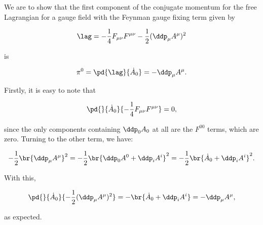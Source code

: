 \section{}

We are to show that the first component of the conjugate momentum for the free Lagrangian for a gauge field with the Feynman gauge fixing term given by 

\begin{equation}
    \lag = -\frac{1}{4}F_{\mu\nu}F^{\mu\nu} - \frac{1}{2}(\ddp_{\mu}A^{\mu})^2
\end{equation}

is

\begin{equation}
    \pi^0 = \pd{\lag}{\dot{A}_0} = -\ddp_{\mu}A^{\mu}.
\end{equation}

Firstly, it is easy to note that 

\begin{equation*}
    \pd{}{\dot{A}_0}{-\frac{1}{4}F_{\mu\nu}F^{\mu\nu}} = 0,
\end{equation*}

since the only components containing $\ddp_0A_0$ at all are the $F^{00}$ terms, which are zero. Turning to the other term, we have:

\begin{equation*}
    -\frac{1}{2}\br{\ddp_{\mu}A^{\mu}}^2 = -\frac{1}{2}\br{\ddp_0A^0  + \ddp_iA^i}^2 = -\frac{1}{2}\br{\dot{A}_0  + \ddp_iA^i}^2.
\end{equation*}

With this,

\begin{equation*}
    \pd{}{\dot{A}_0}{-\frac{1}{2}(\ddp_{\mu}A^{\mu})^2} = -\br{\dot{A}_0  + \ddp_i A^i} = -\ddp_{\mu}A^{\mu},
\end{equation*}

as expected.